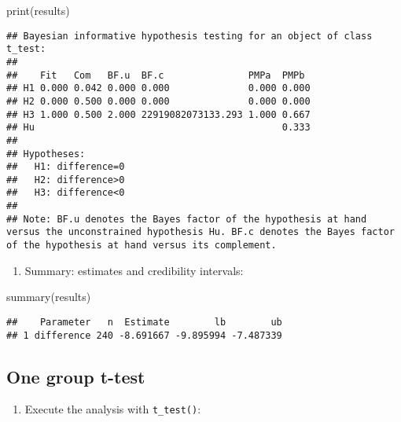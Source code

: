 \documentclass[
]{book}
\newenvironment{Shaded}{\begin{snugshade}}{\end{snugshade}}
\newcommand{\CommentTok}[1]{\textcolor[rgb]{0.56,0.35,0.01}{\textit{#1}}}
\newcommand{\FunctionTok}[1]{\textcolor[rgb]{0.00,0.00,0.00}{#1}}
\newcommand{\NormalTok}[1]{#1}
\newcommand{\OtherTok}[1]{\textcolor[rgb]{0.56,0.35,0.01}{#1}}
\newcommand{\SpecialCharTok}[1]{\textcolor[rgb]{0.00,0.00,0.00}{#1}}
\providecommand{\tightlist}{%
  \setlength{\itemsep}{0pt}\setlength{\parskip}{0pt}}
\begin{document}
\begin{Shaded}
\begin{Highlighting}[]
\FunctionTok{print}\NormalTok{(results)}
\end{Highlighting}
\end{Shaded}

\begin{verbatim}
## Bayesian informative hypothesis testing for an object of class t_test:
## 
##    Fit   Com   BF.u  BF.c               PMPa  PMPb 
## H1 0.000 0.042 0.000 0.000              0.000 0.000
## H2 0.000 0.500 0.000 0.000              0.000 0.000
## H3 1.000 0.500 2.000 22919082073133.293 1.000 0.667
## Hu                                            0.333
## 
## Hypotheses:
##   H1: difference=0
##   H2: difference>0
##   H3: difference<0
## 
## Note: BF.u denotes the Bayes factor of the hypothesis at hand versus the unconstrained hypothesis Hu. BF.c denotes the Bayes factor of the hypothesis at hand versus its complement.
\end{verbatim}

\begin{enumerate}
\def\labelenumi{\arabic{enumi})}
\setcounter{enumi}{3}
\tightlist
\item
  Summary: estimates and credibility intervals:
\end{enumerate}

\begin{Shaded}
\begin{Highlighting}[]
\FunctionTok{summary}\NormalTok{(results)}
\end{Highlighting}
\end{Shaded}

\begin{verbatim}
##    Parameter   n  Estimate        lb        ub
## 1 difference 240 -8.691667 -9.895994 -7.487339
\end{verbatim}

\hypertarget{one-group-t-test}{%
\subsection{One group t-test}\label{one-group-t-test}}

\begin{enumerate}
\def\labelenumi{\arabic{enumi})}
\tightlist
\item
  Execute the analysis with \texttt{t\_test()}:
\end{enumerate}

\begin{Shaded}
\end{Shaded}
\end{document}

